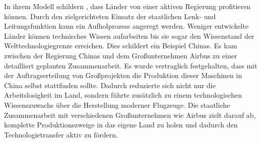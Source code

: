 In ihrem Modell schildern \citet{Acemoglu.2006}, dass L{\"a}nder von einer aktiven Regierung profitieren k{\"o}nnen. Durch den zielgerichteten Einsatz der staatlichen Lenk- und Leitungsfunktion kann ein Aufholprozess angeregt werden. Weniger entwickelte L{\"a}nder können technisches Wissen aufarbeiten bis sie sogar den Wissenstand der Welttechnologiegrenze erreichen. Dies schildert ein Beispiel Chinas. Es kam zwischen der Regierung Chinas und dem Gro{\ss}unternehmen Airbus zu einer detailliert geplanten Zusammenarbeit. Es wurde vertraglich festgehalten, dass mit der Auftragserteilung von Gro{\ss}projekten die Produktion dieser Maschinen in China selbst stattfinden sollte. Dadurch reduzierte sich nicht nur die Arbeitslosigkeit im Land, sondern führte zus{\"a}tzlich zu einem technologischen Wissenszuwachs {\"u}ber die Herstellung moderner Flugzeuge. Die staatliche Zusammenarbeit mit verschiedenen Gro{\ss}unternehmen wie Airbus zielt darauf ab, komplette Produktionszweige in das eigene Land zu holen und dadurch den Technologietransfer aktiv zu f{\"o}rdern.\\


